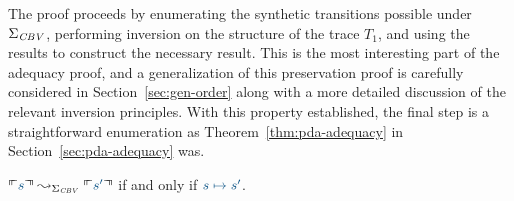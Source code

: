 







\noindent
The proof proceeds by enumerating the synthetic transitions
possible under $\Sigma_{\it CBV}$, performing inversion on the 
structure of the trace $T_1$, and using the results to construct
the necessary result.
This is the most interesting part of the adequacy proof, and a
generalization of this preservation proof is carefully considered in
Section~\ref{sec:gen-order} along with a more detailed discussion of
the relevant inversion principles.  With this property established,
the final step is a straightforward enumeration as
Theorem~\ref{thm:pda-adequacy} in Section~\ref{sec:pda-adequacy} was.

\bigskip
\begin{theorem}\label{thm:stepad3}
$\ctxinterp{s} \leadsto_{\Sigma_{\it CBV}} \ctxinterp{s'}$
if and only if $\obj{s \mapsto s'}$.
\end{theorem}
\bigskip

